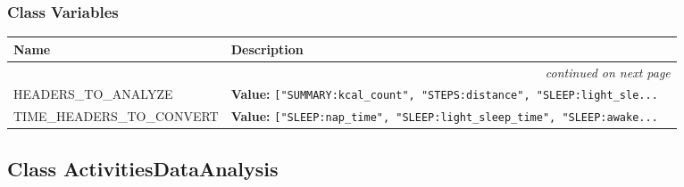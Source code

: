   \subsubsection{Class Variables}

    \vspace{-1cm}
\hspace{\varindent}\begin{longtable}{|p{\varnamewidth}|p{\vardescrwidth}|l}
\cline{1-2}
\cline{1-2} \centering \textbf{Name} & \centering \textbf{Description}& \\
\cline{1-2}
\endhead\cline{1-2}\multicolumn{3}{r}{\small\textit{continued on next page}}\\\endfoot\cline{1-2}
\endlastfoot\raggedright H\-E\-A\-D\-E\-R\-S\-\_\-T\-O\-\_\-A\-N\-A\-L\-Y\-Z\-E\- & \raggedright \textbf{Value:} 
{\tt ["SUMMARY:kcal\_count", "STEPS:distance", "SLEEP:light\_sle\texttt{...}}&\\
\cline{1-2}
\raggedright T\-I\-M\-E\-\_\-H\-E\-A\-D\-E\-R\-S\-\_\-T\-O\-\_\-C\-O\-N\-V\-E\-R\-T\- & \raggedright \textbf{Value:} 
{\tt ["SLEEP:nap\_time", "SLEEP:light\_sleep\_time", "SLEEP:awake\texttt{...}}&\\
\cline{1-2}
\end{longtable}



\subsection{Class ActivitiesDataAnalysis}

